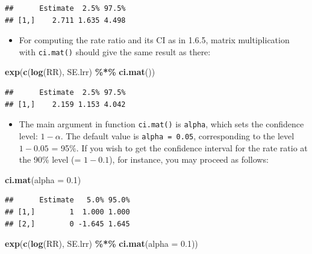 \documentclass[
]{book}
\newenvironment{Shaded}{\begin{snugshade}}{\end{snugshade}}
\newcommand{\AttributeTok}[1]{\textcolor[rgb]{0.13,0.29,0.53}{#1}}
\newcommand{\FloatTok}[1]{\textcolor[rgb]{0.00,0.00,0.81}{#1}}
\newcommand{\FunctionTok}[1]{\textcolor[rgb]{0.13,0.29,0.53}{\textbf{#1}}}
\newcommand{\NormalTok}[1]{#1}
\newcommand{\SpecialCharTok}[1]{\textcolor[rgb]{0.81,0.36,0.00}{\textbf{#1}}}
\providecommand{\tightlist}{%
  \setlength{\itemsep}{0pt}\setlength{\parskip}{0pt}}
\theoremstyle{definition}
\theoremstyle{definition}
\theoremstyle{definition}
\theoremstyle{definition}
\theoremstyle{remark}
\begin{document}
\begin{verbatim}
##      Estimate  2.5% 97.5%
## [1,]    2.711 1.635 4.498
\end{verbatim}

\begin{itemize}
\tightlist
\item
  For computing the rate ratio and its CI as in 1.6.5, matrix
  multiplication with \texttt{ci.mat()} should give the same result as
  there:
\end{itemize}

\begin{Shaded}
\begin{Highlighting}[]
\FunctionTok{exp}\NormalTok{(}\FunctionTok{c}\NormalTok{(}\FunctionTok{log}\NormalTok{(RR), SE.lrr) }\SpecialCharTok{\%*\%} \FunctionTok{ci.mat}\NormalTok{())}
\end{Highlighting}
\end{Shaded}

\begin{verbatim}
##      Estimate  2.5% 97.5%
## [1,]    2.159 1.153 4.042
\end{verbatim}

\begin{itemize}
\tightlist
\item
  The main argument in function \texttt{ci.mat()} is \texttt{alpha},
  which sets the confidence level: \(1 - \alpha\). The default value is
  \texttt{alpha\ =\ 0.05}, corresponding to the level \(1 - 0.05\) = 95\%.
  If you wish to get the confidence interval for the rate ratio at
  the 90\% level (= \(1-0.1\)), for instance, you may proceed as
  follows:
\end{itemize}

\begin{Shaded}
\begin{Highlighting}[]
\FunctionTok{ci.mat}\NormalTok{(}\AttributeTok{alpha =} \FloatTok{0.1}\NormalTok{)}
\end{Highlighting}
\end{Shaded}

\begin{verbatim}
##      Estimate   5.0% 95.0%
## [1,]        1  1.000 1.000
## [2,]        0 -1.645 1.645
\end{verbatim}

\begin{Shaded}
\begin{Highlighting}[]
\FunctionTok{exp}\NormalTok{(}\FunctionTok{c}\NormalTok{(}\FunctionTok{log}\NormalTok{(RR), SE.lrr) }\SpecialCharTok{\%*\%} \FunctionTok{ci.mat}\NormalTok{(}\AttributeTok{alpha =} \FloatTok{0.1}\NormalTok{))}
\end{Highlighting}
\end{Shaded}
\end{document}
